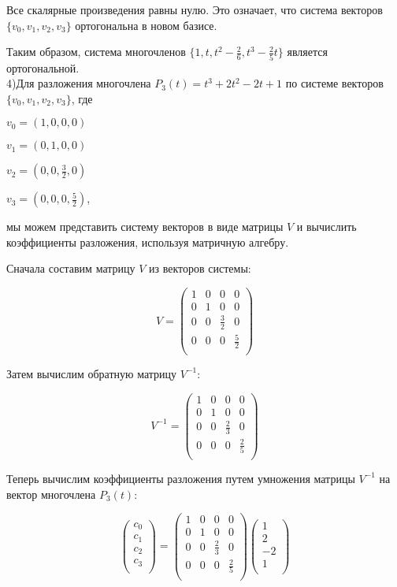 \documentclass{article}
\begin{document}
Все скалярные произведения равны нулю. Это означает, что система векторов \(\{v_0, v_1, v_2, v_3\}\) ортогональна в новом базисе.

Таким образом, система многочленов \(\{1, t, t^2-\frac{2}{6}, t^3-\frac{2}{5}t\}\) является ортогональной.\\


4)Для разложения многочлена \(P_3(t) = t^3+2t^2-2t+1\) по системе векторов \(\{v_0, v_1, v_2, v_3\}\), где

\(v_0 = (1, 0, 0, 0)\)

\(v_1 = (0, 1, 0, 0)\)

\(v_2 = (0, 0, \frac{3}{2}, 0)\)

\(v_3 = (0, 0, 0, \frac{5}{2})\),

мы можем представить систему векторов в виде матрицы \(V\) и вычислить коэффициенты разложения, используя матричную алгебру.

Сначала составим матрицу \(V\) из векторов системы:

\[
V = \begin{pmatrix}
1 & 0 & 0 & 0 \\
0 & 1 & 0 & 0 \\
0 & 0 & \frac{3}{2} & 0 \\
0 & 0 & 0 & \frac{5}{2} \\
\end{pmatrix}
\]

Затем вычислим обратную матрицу \(V^{-1}\):

\[
V^{-1} = \begin{pmatrix}
1 & 0 & 0 & 0 \\
0 & 1 & 0 & 0 \\
0 & 0 & \frac{2}{3} & 0 \\
0 & 0 & 0 & \frac{2}{5} \\
\end{pmatrix}
\]

Теперь вычислим коэффициенты разложения путем умножения матрицы \(V^{-1}\) на вектор многочлена \(P_3(t)\):

\[
\begin{pmatrix}
c_0 \\
c_1 \\
c_2 \\
c_3 \\
\end{pmatrix}
=
\begin{pmatrix}
1 & 0 & 0 & 0 \\
0 & 1 & 0 & 0 \\
0 & 0 & \frac{2}{3} & 0 \\
0 & 0 & 0 & \frac{2}{5} \\
\end{pmatrix}
\begin{pmatrix}
1 \\
2 \\
-2 \\
1 \\
\end{pmatrix}
\]
\end{document}
